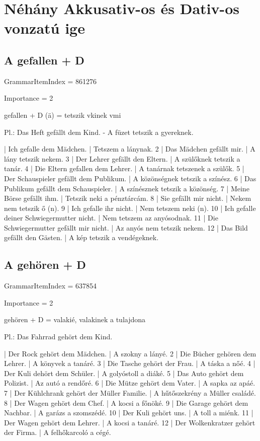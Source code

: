 \documentclass{article}
\newenvironment{desc}{\verbatim}{\endverbatim}
\newenvironment{exmp}{\verbatim}{\endverbatim}
\begin{document}
\section{Néhány Akkusativ-os és Dativ-os vonzatú ige}

\subsection{A gefallen + D}

GrammarItemIndex = 861276

Importance = 2

\begin{desc}
gefallen + D (ä) = tetszik vkinek vmi

Pl.: Das Heft gefällt dem Kind. - A füzet tetszik a gyereknek.
\end{desc}

\begin{exmp}
1 | Ich gefalle dem Mädchen. | Tetszem a lánynak.
2 | Das Mädchen gefällt mir. | A lány tetszik nekem.
3 | Der Lehrer gefällt den Eltern. | A szülőknek tetszik a tanár.
4 | Die Eltern gefallen dem Lehrer. | A tanárnak tetszenek a szülők.
5 | Der Schauspieler gefällt dem Publikum. | A közönségnek tetszik a színész.
6 | Das Publikum gefällt dem Schauspieler. | A színésznek tetszik a közönség.
7 | Meine Börse gefällt ihm. | Tetszik neki a pénztárcám.
8 | Sie gefällt mir nicht. | Nekem nem tetszik ő (n).
9 | Ich gefalle ihr nicht. | Nem tetszem neki (n).
10 | Ich gefalle deiner Schwiegermutter nicht. | Nem tetszem az anyósodnak.
11 | Die Schwiegermutter gefällt mir nicht. | Az anyós nem tetszik nekem.
12 | Das Bild gefällt den Gästen. | A kép tetszik a vendégeknek.
\end{exmp}

\subsection{A gehören + D}

GrammarItemIndex = 637854

Importance = 2

\begin{desc}
gehören + D = valakié, valakinek a tulajdona

Pl.: Das Fahrrad gehört dem Kind.
\end{desc}

\begin{exmp}
1 | Der Rock gehört dem Mädchen. | A szokny a lányé.
2 | Die Bücher gehören dem Lehrer. | A könyvek a tanáré.
3 | Die Tasche gehört der Frau. | A táska a nőé.
4 | Der Kuli dehört dem Schüler. | A golyóstoll a diáké.
5 | Das Auto gehört dem Polizist. | Az autó a rendőré.
6 | Die Mütze gehört dem Vater. | A sapka az apáé.
7 | Der Kühlchrank gehört der Müller Familie. | A hűtőszekrény a Müller családé.
8 | Der Wagen gehört dem Chef. | A kocsi a főnöké.
9 | Die Garage gehört dem Nachbar. | A garázs a szomszédé.
10 | Der Kuli gehört uns. | A toll a miénk.
11 | Der Wagen gehört dem Lehrer. | A kocsi a tanáré.
12 | Der Wolkenkratzer gehört der Firma. | A felhőkarcoló a cégé.
\end{exmp}
\end{document}

